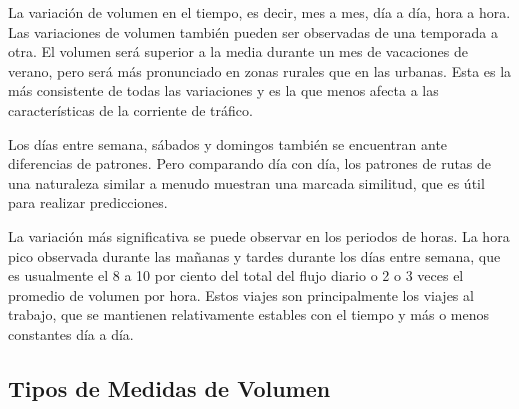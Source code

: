 La variación de volumen en el tiempo, es decir, mes a mes, día a día, hora a hora. Las variaciones de volumen también pueden ser observadas de una temporada a otra. El volumen será superior a la media durante un mes de vacaciones de verano, pero será más pronunciado en zonas rurales que en las urbanas. Esta es la más consistente de todas las variaciones y es la que menos afecta a las características de la corriente de tráfico.

Los días entre semana, sábados y domingos también se encuentran ante diferencias de patrones. Pero comparando día con día, los patrones de rutas de una naturaleza similar a menudo muestran una marcada similitud, que es útil para realizar predicciones.

La variación más significativa se puede observar en los periodos de horas. La hora pico observada durante las mañanas y tardes durante los días entre semana, que es usualmente el 8 a 10 por ciento del total del flujo diario o 2 o 3 veces el promedio de volumen por hora. Estos viajes son principalmente los viajes al trabajo, que se mantienen relativamente estables con el tiempo y más o menos constantes día a día.

\subsection{Tipos de Medidas de Volumen}

